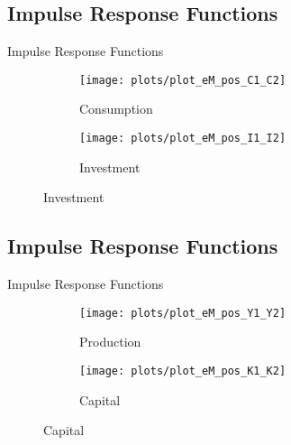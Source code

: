 \documentclass[../quali_slides.tex]{subfiles}
\begin{document}

\subsection{Impulse Response Functions}

\begin{frame}{Impulse Response Functions}

\begin{figure}[h!]
	\centering
	\begin{subfigure}[b]{0.45\textwidth}
		\centering
		\texttt{[image: plots/plot\_eM\_pos\_C1\_C2]}
		\caption{\scriptsize Consumption}
		\label{fig:plot_eM_pos_C1_C2}
	\end{subfigure}
	\hspace*{0.3cm}
	\begin{subfigure}[b]{0.45\textwidth}
		\centering
		\texttt{[image: plots/plot\_eM\_pos\_I1\_I2]}
		\caption{\scriptsize Investment}
		\label{fig:plot_eM_pos_I1_I2}
	\end{subfigure}
\end{figure}

\end{frame}


\subsection{Impulse Response Functions}

\begin{frame}{Impulse Response Functions}
	
	\begin{figure}[h!]
		\centering
		\begin{subfigure}[b]{0.45\textwidth}
			\centering
			\texttt{[image: plots/plot\_eM\_pos\_Y1\_Y2]}
			\caption{\scriptsize Production}
			\label{fig:plot_eM_pos_Y1_Y2}
		\end{subfigure}
		\hspace*{0.3cm}
		\begin{subfigure}[b]{0.45\textwidth}
			\centering
			\texttt{[image: plots/plot\_eM\_pos\_K1\_K2]}
			\caption{\scriptsize Capital}
			\label{fig:plot_eM_pos_K1_K2}
		\end{subfigure}
	\end{figure}
	
\end{frame}
\end{document}

